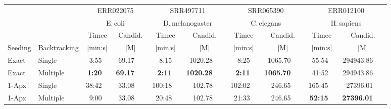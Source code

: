 \begin{tabular}{llrrrrrrrr}
\toprule

  & \multirow{2}{*}{}  &\multicolumn{ 2 }{c}{  ERR022075 } &\multicolumn{ 2 }{c}{  SRR497711 } &\multicolumn{ 2 }{c}{  SRR065390 } &\multicolumn{ 2 }{c}{  ERR012100 } \\
  &&\multicolumn{2}{c}{E.\,coli}&\multicolumn{2}{c}{D.\,melanogaster}&\multicolumn{2}{c}{C.\,elegans}&\multicolumn{2}{c}{H.\,sapiens} \\
  \cmidrule(lr){3-4}\cmidrule(lr){5-6}\cmidrule(lr){7-8}\cmidrule(lr){9-10} 
  
  & &\multicolumn{1}{c}{  Timee } &\multicolumn{1}{c}{  Candid. } &\multicolumn{1}{c}{  Timee } &\multicolumn{1}{c}{  Candid. } &\multicolumn{1}{c}{  Timee } &\multicolumn{1}{c}{  Candid. } &\multicolumn{1}{c}{  Timee } &\multicolumn{1}{c}{  Candid. } \\
  Seeding & Backtracking  &\multicolumn{1}{c}{  [min:s] } &\multicolumn{1}{c}{  [M] } &\multicolumn{1}{c}{  [min:s] } &\multicolumn{1}{c}{  [M] } &\multicolumn{1}{c}{  [min:s] } &\multicolumn{1}{c}{  [M] } &\multicolumn{1}{c}{  [min:s] } &\multicolumn{1}{c}{  [M] } \\

\midrule

Exact  &  Single    & \phantom{000}3:55\ \  & 69.17\ \ \  & \phantom{000}8:15\ \  & 1020.28\ \ \  & \phantom{000}8:25\ \  & 1065.70\ \ \  & \phantom{00}55:54\ \  & 294943.86\ \ \  \\ 
Exact  &  Multiple  & \phantom{000}\textbf{1:20}\ \  & \textbf{69.17}\ \ \  & \phantom{000}\textbf{2:11}\ \  & \textbf{1020.28}\ \ \  & \phantom{000}\textbf{2:11}\ \  & \textbf{1065.70}\ \ \  & \phantom{00}41:52\ \  & 294943.86\ \ \  \\

\midrule

1-Apx &  Single     & \phantom{00}38:42\ \  & 33.08\ \ \  & \phantom{0}100:18\ \  & 102.78\ \ \  & \phantom{0}102:02\ \  & 246.65\ \ \  & \phantom{0}165:45\ \  & 27396.01\ \ \  \\ 
1-Apx &  Multiple   & \phantom{00}9:00\ \  & 33.08\ \ \  & \phantom{00}20:48\ \  & 102.78\ \ \  & \phantom{00}21:33\ \  & 246.65\ \ \  & \phantom{00}\textbf{52:15}\ \  & \textbf{27396.01}\ \ \  \\ 
\bottomrule
\end{tabular}

